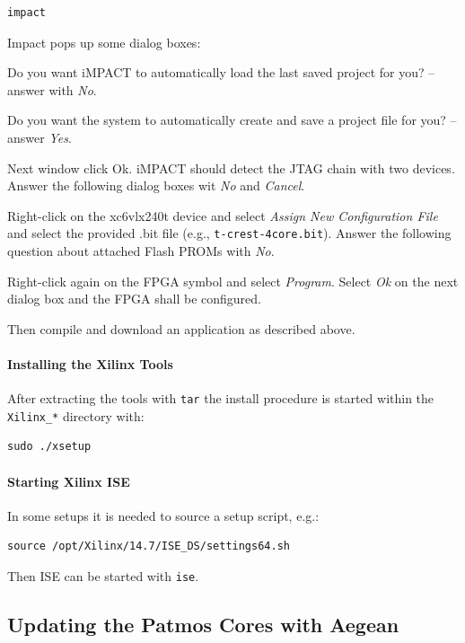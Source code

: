 \documentclass[a4paper,fontsize=10pt,twoside,DIV15,BCOR12mm,headinclude=true,footinclude=false,pagesize,bibtotoc]{scrbook}
\newcommand{\code}[1]{{\texttt{#1}}}
\begin{document}
\begin{verbatim} 
impact
\end{verbatim}

Impact pops up some dialog boxes:

Do you want iMPACT to automatically load the last saved project for you? -- answer with \emph{No}.

Do you want the system to automatically create and save a project file for you? -- answer \emph{Yes}.

Next window click Ok. iMPACT should detect the JTAG chain with two devices. Answer the
following dialog boxes wit \emph{No} and \emph{Cancel}.

Right-click on the xc6vlx240t device and select \emph{Assign New Configuration File} and select
the provided .bit file (e.g., \code{t-crest-4core.bit}). Answer the following question about attached
Flash PROMs with \emph{No}.

Right-click again on the FPGA symbol and select \emph{Program}. Select \emph{Ok} on the next
dialog box and the FPGA shall be configured.

Then compile and download an application as described above.

\paragraph{Installing the Xilinx Tools}

After extracting the tools with \code{tar} the install procedure is started within the
\code{Xilinx\_*} directory with:

\begin{verbatim}
sudo ./xsetup
\end{verbatim}

\paragraph{Starting Xilinx ISE}

In some setups it is needed to source a setup script, e.g.:

\begin{verbatim}
source /opt/Xilinx/14.7/ISE_DS/settings64.sh
\end{verbatim}

Then ISE can be started with \code{ise}.

\subsection{Updating the Patmos Cores with Aegean}
\end{document}
